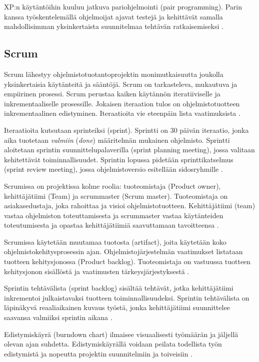 \documentclass[finnish]{tktltiki2}
\theoremstyle{definition}
\theoremstyle{remark}
\begin{document}
XP:n käytäntöihin kuuluu jatkuva pariohjelmointi (pair programming). Parin kanssa työskentelemällä ohjelmoijat ajavat testejä ja kehittävät samalla mahdollisimman yksinkertaista suunnitelmaa tehtävän ratkaisemiseksi \cite{BEC99}.  

\subsection{Scrum}

Scrum lähestyy ohjelmistotuotantoprojektin monimutkaisuutta joukolla yksinkertaisia käytänteitä ja sääntöjä. Scrum on tarkasteleva, mukautuva ja empiirinen prosessi. Scrum perustaa kaiken käytännön iteratiiviselle ja inkrementaaliselle prosessille. Jokaisen iteraation tulos on ohjelmistotuotteen inkrementaalinen edistyminen. Iteraatioita vie eteenpäin lista vaatimuksista \cite{SCH09}.

Iteraatioita kutsutaan sprinteiksi (sprint). Sprintti on 30 päivän iteraatio, jonka aika tuotetaan \textit{valmiin} (\textit{done}) määritelmän mukainen ohjelmisto. Sprintti aloitetaan sprintin suunnittelupalaverilla (sprint planning meeting), jossa valitaan kehitettävät toiminnallisuudet. Sprintin lopussa pidetään sprinttikatselmus (sprint review meeting), jossa ohjelmistoversio esitellään sidosryhmille \cite{SCH09}.

Scrumissa on projektissa kolme roolia: tuoteomistaja (Product owner), kehittäjätiimi (Team) ja scrummaster (Scrum master). Tuoteomistaja on asiakasedustaja, joka rahoittaa ja visioi ohjelmistotuotteen. Kehittäjätiimi (team) vastaa ohjelmiston toteuttamisesta ja scrummaster vastaa käytänteiden toteutumisesta ja opastaa kehittäjätiimiä saavuttamaan tavoitteensa \cite{SCH09}.

Scrumissa käytetään muutamaa tuotosta (artifact), joita käytetään koko ohjelmistokehitysprosessin ajan. Ohjelmistojärjestelmän vaatimukset listataan tuotteen kehitysjonossa (Product backlog). Tuoteomistaja on vastuussa tuotteen kehitysjonon sisällöstä ja vaatimusten tärkeysjärjestyksestä \cite{SCH09}.

Sprintin tehtävälista (sprint backlog) sisältää tehtävät, jotka kehittäjätiimi inkrementoi julkaistavaksi tuotteen toiminnallisuudeksi. Sprintin tehtävälista on läpinäkyvä reaaliaikainen kuvaus työstä, jonka kehittäjätiimi suunnittelee saavansa valmiiksi sprintin aikana \cite{SCH09}.

Edistymiskäyrä (burndown chart) ilmaisee visuaalisesti työmäärän ja jäljellä olevan ajan suhdetta. Edistymiskäyrällä voidaan peilata todellista työn edistymistä ja nopeutta projektin suunnitelmiin ja toiveisiin \cite{SCH09}.
\end{document}
